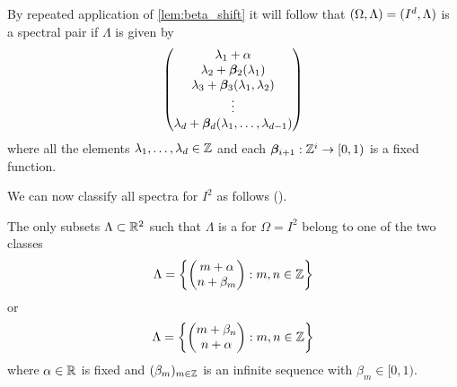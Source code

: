 \documentclass[../thesis.tex]{subfiles}
\begin{document}
\begin{example}
    By repeated application of \cref{lem:beta_shift} it will follow that $(\Omega,\Lambda)= (I^d, \Lambda)$ is a spectral pair if $\Lambda$ is given by %
    \begin{equation*}
        \begin{pmatrix}
            \lambda_1 +\alpha\\
            \lambda_2+\bm{\beta}_2(\lambda_1)\\
            \lambda_3+\bm{\beta}_3(\lambda_1,\lambda_2)\\
            \vdots\\
            \lambda_d+\bm{\beta}_d(\lambda_1,\dots,\lambda_{d-1})\\
        \end{pmatrix}
    \end{equation*}
    where all the elements $\lambda_1, \dots, \lambda_d \in \mathbb{Z}$ and each $\bm{\beta}_{i+1}:\mathbb{Z}^{i} \rightarrow [0,1)$ is a fixed function.
\end{example}
We can now classify all spectra for $I^2$ as follows (\cite{jorgensenSpectralPairsCartesian2001}). 
\begin{theorem}\label{thrm:class_all_shift_2d}
    The only subsets $\Lambda \subset \mathbb{R}^2$ such that $\Lambda$ is a for $\Omega = I^2$ belong to one of the two classes
    \begin{equation}\label{eq:2d_all_shift_class_1}
        \Lambda = \left\{
            \begin{pmatrix}
            m + \alpha \\
            n + \beta_m
            \end{pmatrix} : m,n \in  \mathbb{Z}
            \right\}
    \end{equation}
    or
    \begin{equation}\label{eq:2d_all_shift_class_2}
        \Lambda = \left\{
            \begin{pmatrix}
            m + \beta_n\\
            n + \alpha
            \end{pmatrix} : m,n \in  \mathbb{Z}
            \right\}
    \end{equation}
    where $\alpha \in \mathbb{R}$ is fixed and $(\beta_m)_{m\in \mathbb{Z}}$ is an infinite sequence with $\beta_m \in [0,1)$.
\end{theorem}
\end{document}

